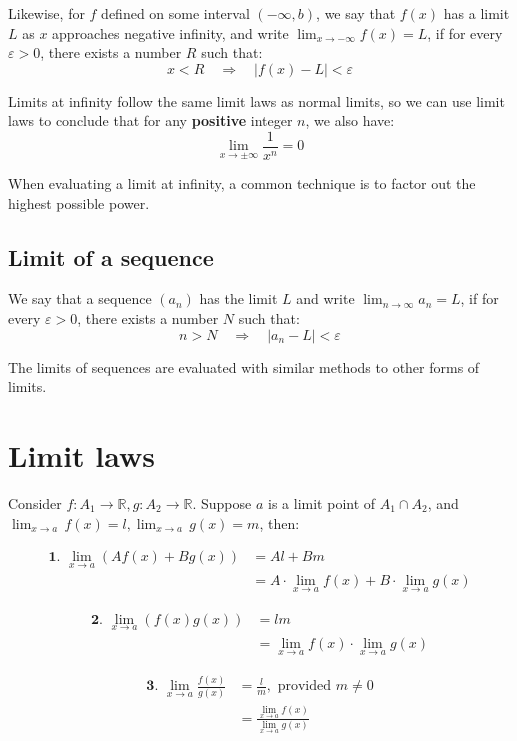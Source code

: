 \documentclass[11pt]{article}
\begin{document}
Likewise, for \(f\) defined on some interval \((-\infty, b)\), we say that \(f(x)\) has a limit \(L\) as \(x\) approaches negative infinity, and write \(\lim_{x \rightarrow - \infty} f(x) = L\), if for every \(\varepsilon > 0\), there exists a number \(R\) such that:
\[x < R \quad \Rightarrow \quad |f(x) - L| < \varepsilon\]

Limits at infinity follow the same limit laws as normal limits, so we can use limit laws to conclude that for any \textbf{positive} integer \(n\), we also have:
\[\lim_{x \rightarrow \pm \infty} \frac{1}{x^n} = 0\]

When evaluating a limit at infinity, a common technique is to factor out the highest possible power.

\subsection{Limit of a sequence}
\label{sec:org45213da}
We say that a sequence \((a_n)\) has the limit \(L\) and write \(\lim_{n \rightarrow \infty} a_n = L\), if for every \(\varepsilon > 0\), there exists a number \(N\) such that:
\[n > N \quad \Rightarrow \quad |a_n - L| < \varepsilon\]

The limits of sequences are evaluated with similar methods to other forms of limits.


\section{Limit laws}
\label{sec:org38b85c6}
Consider \(f : A_1 \rightarrow \mathbb{R}, g : A_2 \rightarrow \mathbb{R}\). Suppose \(a\) is a limit point of \(A_1 \cap A_2\), and \(\lim_{x \rightarrow a} \, f(x) = l, \lim_{x \rightarrow a} \, g(x) = m\), then:

\begin{align*}
\textbf{1. } \lim_{x \rightarrow a}(Af(x) + Bg(x)) &= Al + Bm \\
&= A \cdot \lim_{x \rightarrow a} f(x) + B \cdot \lim_{x \rightarrow a} g(x)
\end{align*}

\begin{align*}
\textbf{2. } \lim_{x \rightarrow a}(f(x) g(x)) &= lm \\
&= \lim_{x \rightarrow a} f(x) \cdot \lim_{x \rightarrow a} g(x)
\end{align*}

\begin{align*}
\textbf{3. } \lim_{x \rightarrow a} \frac{f(x)}{g(x)} &= \frac{l}{m},
\text{ provided } m \neq 0 \\
&= \frac{\lim_{x \rightarrow a} f(x)}{\lim_{x \rightarrow a} g(x)}
\end{align*}
\end{document}
